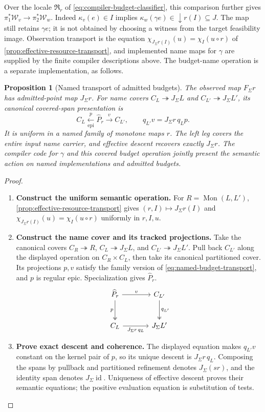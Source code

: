 \documentclass[11pt,a4paper]{article}
\numberwithin{algorithm}{section}
\numberwithin{equation}{section}
\newtheorem{proposition}[proposition]{Proposition}
\theoremstyle{definition}
\theoremstyle{remark}
\theoremstyle{plain}
\newcommand{\J}{J_{\Sigma}}
\newcommand{\F}{F_{\Sigma}}
\newcommand{\id}{\operatorname{id}}
\newcommand{\onto}{\twoheadrightarrow}
\theoremstyle{definition}
\theoremstyle{plain}
\begin{document}
Over the locale $\mathfrak R_r$ of
\eqref{eq:compiler-budget-classifier}, this comparison further
gives $\pi_1^*\mathscr W_v\to\pi_2^*\mathscr W_w$.
Indeed $\kappa_v(e)\in I$ implies
$\kappa_w(\gamma e)\in\downarrow r(I)\subseteq J$.
The map still retains $\gamma e$; it is not obtained by choosing
a witness from the target feasibility image. Observation transport
is the equation
$\chi_{\J r(I)}(u)=\chi_I(u\circ r)$ of
\cref{prop:effective-resource-transport}, and implemented name
maps for $\gamma$ are supplied by the finite compiler descriptions above.
The budget-name operation is a separate implementation,
as follows.

\begin{proposition}[Named transport of admitted budgets]
\label{prop:named-budget-transport}
The observed map $\F r$ has admitted-point map $\J r$.
For name covers $C_L\onto\J L$ and $C_{L'}\onto\J L'$, its
canonical covered-span presentation is
\begin{equation}\label{eq:named-budget-transport}
 C_L\xleftarrow[\mathrm{epi}]{p}\widehat P_r
 \xrightarrow{v}C_{L'},\qquad
 q_{L'}v=\J r\,q_Lp.
\end{equation}
It is uniform in a named family of monotone maps $r$.
The left leg covers the entire input name carrier, and effective
descent recovers exactly $\J r$. The compiler code for $\gamma$
and this covered budget operation jointly present the semantic
action on named implementations and admitted budgets.
\end{proposition}
\begin{proof}\leavevmode
\begin{enumerate}[leftmargin=*,align=left]
\item \textbf{Construct the uniform semantic operation.}
For $R=\operatorname{Mon}(L,L')$, \cref{prop:effective-resource-transport}
gives $(r,I)\mapsto\J r(I)$ and
$\chi_{\J r(I)}(u)=\chi_I(u\circ r)$ uniformly in $r,I,u$.

\item \textbf{Construct the name cover and its tracked projections.}
Take the canonical covers $C_R\onto R$, $C_L\onto\J L$,
and $C_{L'}\onto\J L'$. Pull back $C_{L'}$ along the
displayed operation on $C_R\times C_L$, then take its canonical
partitioned cover. Its projections $p,v$ satisfy the family version
of \eqref{eq:named-budget-transport}, and $p$ is regular epic.
Specialization gives $\widehat P_r$.
\[
\begin{tikzcd}[column sep=large,row sep=large]
\widehat P_r \arrow[r,"v"] \arrow[d,two heads,"p"'] &
C_{L'} \arrow[d,two heads,"q_{L'}"]\\
C_L \arrow[r,"\J r\,q_L"'] & \J L'
\end{tikzcd}
\]

\item \textbf{Prove exact descent and coherence.}
The displayed equation makes $q_{L'}v$ constant on the kernel
pair of $p$, so its unique descent is $\J r\,q_L$.
Composing the spans by pullback and partitioned refinement denotes
$\J(sr)$, and the identity span denotes $\J\id$.
Uniqueness of effective descent proves their semantic equations;
the positive evaluation equation is substitution of tests.
\end{enumerate}
\end{proof}
\end{document}
